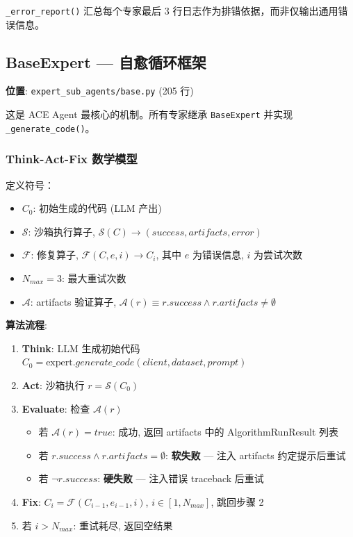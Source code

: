 \documentclass[12pt,a4paper]{article}
\begin{document}
\texttt{\_error\_report()} 汇总每个专家最后 3 行日志作为排错依据，而非仅输出通用错误信息。

\subsection{BaseExpert --- 自愈循环框架}

\textbf{位置}: \texttt{expert\_sub\_agents/base.py} (205 行)

这是 ACE Agent 最核心的机制。所有专家继承 \texttt{BaseExpert} 并实现 \texttt{\_generate\_code()}。

\subsubsection{Think-Act-Fix 数学模型}

定义符号：
\begin{itemize}[nosep]
    \item $C_0$: 初始生成的代码 (LLM 产出)
    \item $\mathcal{S}$: 沙箱执行算子, $\mathcal{S}(C) \rightarrow (success, artifacts, error)$
    \item $\mathcal{F}$: 修复算子, $\mathcal{F}(C, e, i) \rightarrow C_i$, 其中 $e$ 为错误信息, $i$ 为尝试次数
    \item $N_{max} = 3$: 最大重试次数
    \item $\mathcal{A}$: artifacts 验证算子, $\mathcal{A}(r) \equiv r.success \wedge r.artifacts \neq \emptyset$
\end{itemize}

\textbf{算法流程}:

\begin{enumerate}[nosep]
    \item \textbf{Think}: LLM 生成初始代码 $C_0 = \text{expert}.\textit{generate\_code}(client, dataset, prompt)$
    \item \textbf{Act}: 沙箱执行 $r = \mathcal{S}(C_0)$
    \item \textbf{Evaluate}: 检查 $\mathcal{A}(r)$
    \begin{itemize}[nosep]
        \item 若 $\mathcal{A}(r) = true$: 成功, 返回 artifacts 中的 AlgorithmRunResult 列表
        \item 若 $r.success \wedge r.artifacts = \emptyset$: \textbf{软失败} --- 注入 artifacts 约定提示后重试
        \item 若 $\neg r.success$: \textbf{硬失败} --- 注入错误 traceback 后重试
    \end{itemize}
    \item \textbf{Fix}: $C_{i} = \mathcal{F}(C_{i-1}, e_{i-1}, i)$, $i \in [1, N_{max}]$, 跳回步骤 2
    \item 若 $i > N_{max}$: 重试耗尽, 返回空结果
\end{enumerate}
\end{document}
